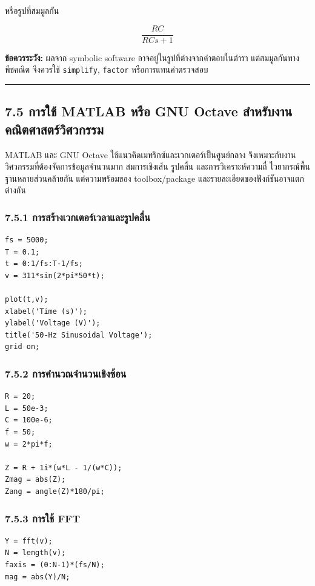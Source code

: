 หรือรูปที่สมมูลกัน

\[
\frac{RC}{RCs+1}
\]

\textbf{ข้อควรระวัง:} ผลจาก symbolic software อาจอยู่ในรูปที่ต่างจากคำตอบในตำรา แต่สมมูลกันทางพีชคณิต จึงควรใช้ \texttt{simplify}, \texttt{factor} หรือการแทนค่าตรวจสอบ

\par\noindent\rule{\textwidth}{0.4pt}\par

\subsection{7.5 การใช้ MATLAB หรือ GNU Octave สำหรับงานคณิตศาสตร์วิศวกรรม}

MATLAB และ GNU Octave ใช้แนวคิดเมทริกซ์และเวกเตอร์เป็นศูนย์กลาง จึงเหมาะกับงานวิศวกรรมที่ต้องจัดการข้อมูลจำนวนมาก สมการเชิงเส้น รูปคลื่น และการวิเคราะห์ความถี่ ไวยากรณ์พื้นฐานหลายส่วนคล้ายกัน แต่ความพร้อมของ toolbox/package และรายละเอียดของฟังก์ชันอาจแตกต่างกัน

\subsubsection{7.5.1 การสร้างเวกเตอร์เวลาและรูปคลื่น}

\begin{verbatim}
fs = 5000;
T = 0.1;
t = 0:1/fs:T-1/fs;
v = 311*sin(2*pi*50*t);

plot(t,v);
xlabel('Time (s)');
ylabel('Voltage (V)');
title('50-Hz Sinusoidal Voltage');
grid on;
\end{verbatim}

\subsubsection{7.5.2 การคำนวณจำนวนเชิงซ้อน}

\begin{verbatim}
R = 20;
L = 50e-3;
C = 100e-6;
f = 50;
w = 2*pi*f;

Z = R + 1i*(w*L - 1/(w*C));
Zmag = abs(Z);
Zang = angle(Z)*180/pi;
\end{verbatim}

\subsubsection{7.5.3 การใช้ FFT}

\begin{verbatim}
Y = fft(v);
N = length(v);
faxis = (0:N-1)*(fs/N);
mag = abs(Y)/N;
\end{verbatim}

